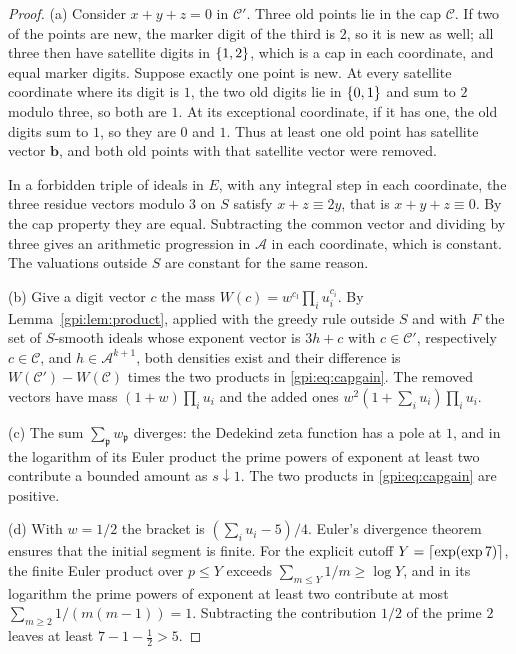 \begin{proof}
(a) Consider $x+y+z=0$ in $\mathcal C'$. Three old points lie in the cap $\mathcal C$. If two
of the points are new, the marker digit of the third is $2$, so it is new as well; all three
then have satellite digits in $\{1,2\}$, which is a cap in each coordinate, and equal
marker digits. Suppose exactly one point is new. At every satellite coordinate where its
digit is $1$, the two old digits lie in $\{0,1\}$ and sum to $2$ modulo three, so both are
$1$. At its exceptional coordinate, if it has one, the old digits sum to $1$, so they are $0$
and $1$. Thus at least one old point has satellite vector $\mathbf b$, and both old points
with that satellite vector were removed.

In a forbidden triple of ideals in $E$, with any integral step in each coordinate, the three
residue vectors modulo $3$ on $S$ satisfy $x+z\equiv2y$, that is $x+y+z\equiv0$. By the cap
property they are equal. Subtracting the common vector and dividing by three gives an
arithmetic progression in $\mathcal A$ in each coordinate, which is constant. The valuations
outside $S$ are constant for the same reason.

(b) Give a digit vector $c$ the mass $W(c)=w^{c_{\mathfrak l}}\prod_iu_i^{c_i}$. By
Lemma~\ref{gpi:lem:product}, applied with the greedy rule outside $S$ and with $F$ the set of
$S$-smooth ideals whose exponent vector is $3h+c$ with $c\in\mathcal C'$, respectively
$c\in\mathcal C$, and $h\in\mathcal A^{k+1}$, both densities exist and their difference is
$W(\mathcal C')-W(\mathcal C)$ times the two products in \eqref{gpi:eq:capgain}. The removed
vectors have mass $(1+w)\prod_iu_i$ and the added ones $w^2(1+\sum_iu_i)\prod_iu_i$.

(c) The sum $\sum_{\mathfrak p}w_{\mathfrak p}$ diverges: the Dedekind zeta function has a
pole at $1$, and in the logarithm of its Euler product the prime powers of exponent at least
two contribute a bounded amount as $s\downarrow1$. The two products in \eqref{gpi:eq:capgain}
are positive.

(d) With $w=1/2$ the bracket is $(\sum_iu_i-5)/4$. Euler's divergence theorem ensures that
the initial segment is finite. For the explicit cutoff $Y=\lceil\exp(\exp7)\rceil$, the finite Euler
product over $p\le Y$ exceeds $\sum_{m\le Y}1/m\ge\log Y$, and in its logarithm the prime
powers of exponent at least two contribute at most $\sum_{m\ge2}1/(m(m-1))=1$. Subtracting
the contribution $1/2$ of the prime $2$ leaves at least $7-1-\tfrac12>5$.
\end{proof}

